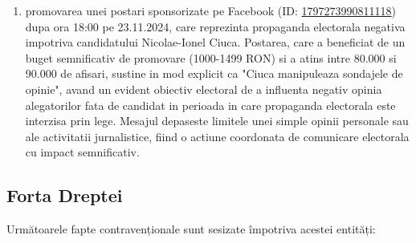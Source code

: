 \documentclass[a4paper,12pt]{article}
\begin{document}
\begin{enumerate}[leftmargin=*, label=\arabic*.)]
    \item promovarea unei postari sponsorizate pe Facebook (ID: \href{https://www.facebook.com/ads/library/?id=1797273990811118}{1797273990811118}) dupa ora 18:00 pe 23.11.2024, care reprezinta propaganda electorala negativa impotriva candidatului Nicolae-Ionel Ciuca. Postarea, care a beneficiat de un buget semnificativ de promovare (1000-1499 RON) si a atins intre 80.000 si 90.000 de afisari, sustine in mod explicit ca "Ciuca manipuleaza sondajele de opinie", avand un evident obiectiv electoral de a influenta negativ opinia alegatorilor fata de candidat in perioada in care propaganda electorala este interzisa prin lege. Mesajul depaseste limitele unei simple opinii personale sau ale activitatii jurnalistice, fiind o actiune coordonata de comunicare electorala cu impact semnificativ.
\end{enumerate}

\vspace{0.5cm}

\subsection{Forta Dreptei}
Următoarele fapte contravenționale sunt sesizate împotriva acestei entități:
\end{document}
